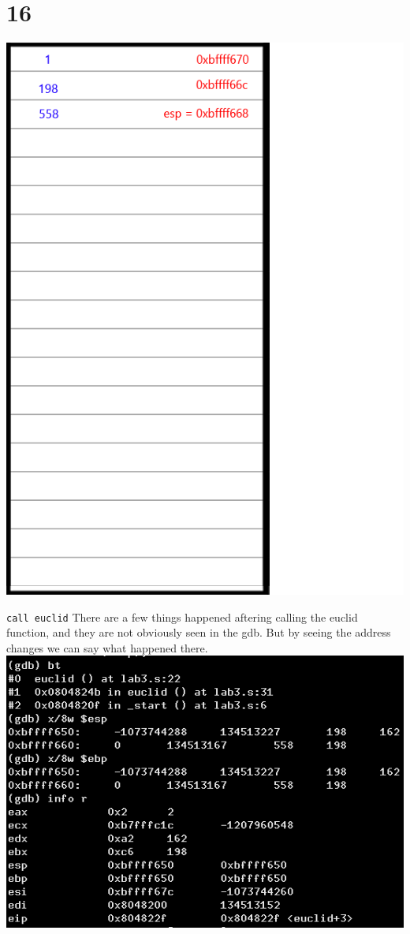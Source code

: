 \documentclass{article}
\begin{document}
\section*{16}
\begin{minipage}{5cm}
\includegraphics[scale=0.3]{s3.png}
\end{minipage}
\begin{minipage}{8cm}
\verb|call euclid|
There are a few things happened aftering calling the euclid function, and they are not obviously seen in the gdb. But by seeing the address changes we can say what happened there.\\
\includegraphics[scale=0.4]{bxi16.png} \\
\end{minipage}
\clearpage
\end{document}
